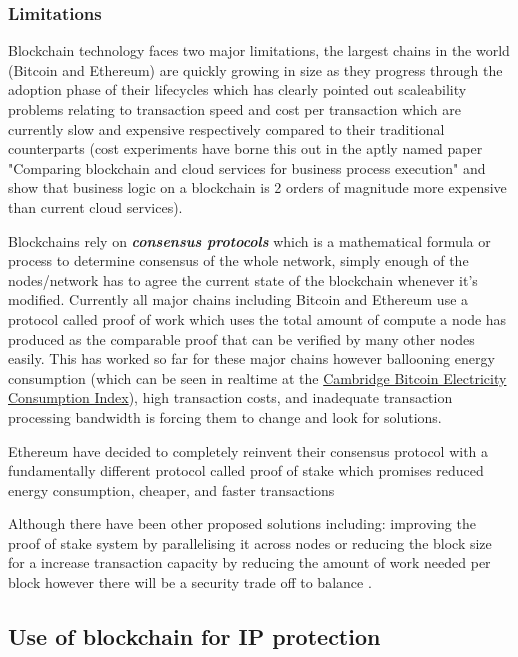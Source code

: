 \documentclass[12pt]{report}
\newcommand{\keyword}[1]{\textbf{\textit{#1}}}
\begin{document}

\subsubsection{Limitations}

Blockchain technology faces two major limitations, the largest chains in the world (Bitcoin and Ethereum) are quickly growing in size as they progress through the adoption phase of their lifecycles which has clearly pointed out scaleability problems relating to transaction speed and cost per transaction which are currently slow and expensive respectively compared to their traditional counterparts (cost experiments have borne this out in the aptly named paper "Comparing blockchain and cloud services for business process execution"\cite{rimba2017comparing} and show that business logic on a blockchain is 2 orders of magnitude more expensive than current cloud services).

Blockchains rely on \keyword{consensus protocols} which is a mathematical formula or process to determine consensus of the whole network, simply enough of the nodes/network has to agree the current state of the blockchain whenever it's modified. Currently all major chains including Bitcoin and Ethereum use a protocol called proof of work \cite{PoW} which uses the total amount of compute a node has produced as the comparable proof that can be verified by many other nodes easily. This has worked so far for these major chains however ballooning energy consumption (which can be seen in realtime at the \href{https://ccaf.io/cbeci/index}{Cambridge Bitcoin Electricity Consumption Index}), high transaction costs, and inadequate transaction processing bandwidth is forcing them to change and look for solutions.

Ethereum have decided to completely reinvent their consensus protocol with a fundamentally different protocol called proof of stake which promises reduced energy consumption, cheaper, and faster transactions \cite{PoS}

Although there have been other proposed solutions including: improving the proof of stake system by parallelising it across nodes \cite{fi12080125} or reducing the block size for a increase transaction capacity by reducing the amount of work needed per block however there will be a security trade off to balance \cite{kiayias2015speed}.

\subsection{Use of blockchain for IP protection}
\end{document}
